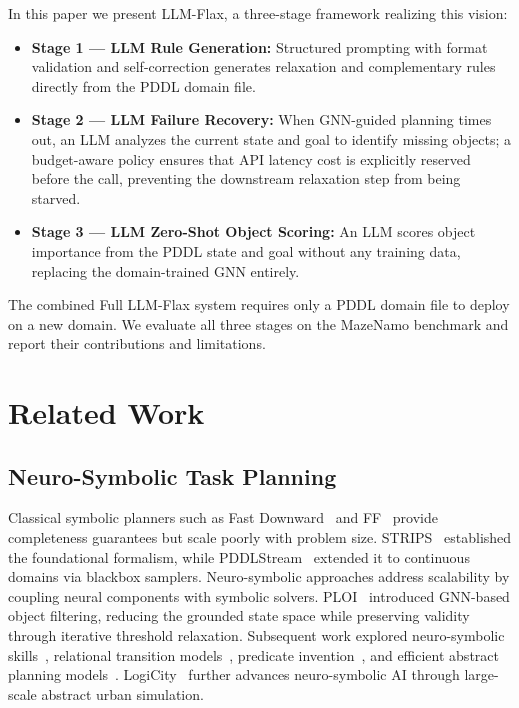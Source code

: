 \documentclass[letterpaper, 10pt, journal, twoside]{IEEEtran}
\newcommand{\method}{LLM-Flax\xspace}
\newcommand{\fullmethod}{Full LLM-Flax\xspace}
\begin{document}
In this paper we present \method, a three-stage framework realizing this vision:
\begin{itemize}[noitemsep,topsep=2pt]
    \item \textbf{Stage 1 --- LLM Rule Generation:} Structured prompting with format validation and self-correction generates relaxation and complementary rules directly from the PDDL domain file.
    \item \textbf{Stage 2 --- LLM Failure Recovery:} When GNN-guided planning times out, an LLM analyzes the current state and goal to identify missing objects; a budget-aware policy ensures that API latency cost is explicitly reserved before the call, preventing the downstream relaxation step from being starved.
    \item \textbf{Stage 3 --- LLM Zero-Shot Object Scoring:} An LLM scores object importance from the PDDL state and goal without any training data, replacing the domain-trained GNN entirely.
\end{itemize}
The combined \fullmethod system requires only a PDDL domain file to deploy on a new domain.
We evaluate all three stages on the MazeNamo benchmark and report their contributions and limitations.


\section{Related Work}
\label{sec:related}

\subsection{Neuro-Symbolic Task Planning}
Classical symbolic planners such as Fast Downward~\cite{helmert2006fast} and FF~\cite{hoffmann2001ff} provide completeness guarantees but scale poorly with problem size.
STRIPS~\cite{fikes1971strips} established the foundational formalism, while PDDLStream~\cite{garrett2020pddlstream} extended it to continuous domains via blackbox samplers.
Neuro-symbolic approaches address scalability by coupling neural components with symbolic solvers.
PLOI~\cite{silver2021planning} introduced GNN-based object filtering, reducing the grounded state space while preserving validity through iterative threshold relaxation.
Subsequent work explored neuro-symbolic skills~\cite{silver2022neurosymbolic}, relational transition models~\cite{chitnis2022learning}, predicate invention~\cite{silver2023predicate}, and efficient abstract planning models~\cite{kumar2023learning}.
LogiCity~\cite{li2024logicity} further advances neuro-symbolic AI through large-scale abstract urban simulation.
\end{document}
